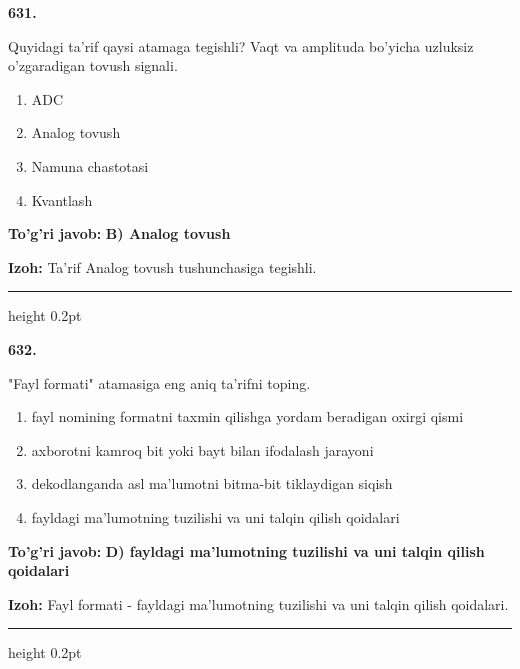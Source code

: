 \documentclass[10pt,a4paper,oneside]{article}
\begin{document}
\noindent\textbf{\color{ink}631.}
\par
Quyidagi ta'rif qaysi atamaga tegishli? Vaqt va amplituda bo'yicha uzluksiz o'zgaradigan tovush signali.
\begin{enumerate}[label=\Alph*),leftmargin=9mm]
\item ADC
\item Analog tovush
\item Namuna chastotasi
\item Kvantlash
\end{enumerate}
\begin{tcolorbox}[enhanced,breakable,colback=teal!4,colframe=teal!50!black,boxrule=0.5pt,arc=1.1mm,left=3mm,right=3mm,top=1.7mm,bottom=1.7mm,before skip=2mm,after skip=2mm]
\textbf{\color{teal}To'g'ri javob:} \textbf{B) Analog tovush}
\par\smallskip
\textbf{Izoh:} Ta'rif Analog tovush tushunchasiga tegishli.
\end{tcolorbox}
\vspace{2mm}\hrule height 0.2pt \vspace{3mm}

\noindent\textbf{\color{ink}632.}
\par
"Fayl formati" atamasiga eng aniq ta'rifni toping.
\begin{enumerate}[label=\Alph*),leftmargin=9mm]
\item fayl nomining formatni taxmin qilishga yordam beradigan oxirgi qismi
\item axborotni kamroq bit yoki bayt bilan ifodalash jarayoni
\item dekodlanganda asl ma'lumotni bitma-bit tiklaydigan siqish
\item fayldagi ma'lumotning tuzilishi va uni talqin qilish qoidalari
\end{enumerate}
\begin{tcolorbox}[enhanced,breakable,colback=teal!4,colframe=teal!50!black,boxrule=0.5pt,arc=1.1mm,left=3mm,right=3mm,top=1.7mm,bottom=1.7mm,before skip=2mm,after skip=2mm]
\textbf{\color{teal}To'g'ri javob:} \textbf{D) fayldagi ma'lumotning tuzilishi va uni talqin qilish qoidalari}
\par\smallskip
\textbf{Izoh:} Fayl formati - fayldagi ma'lumotning tuzilishi va uni talqin qilish qoidalari.
\end{tcolorbox}
\vspace{2mm}\hrule height 0.2pt \vspace{3mm}
\end{document}
